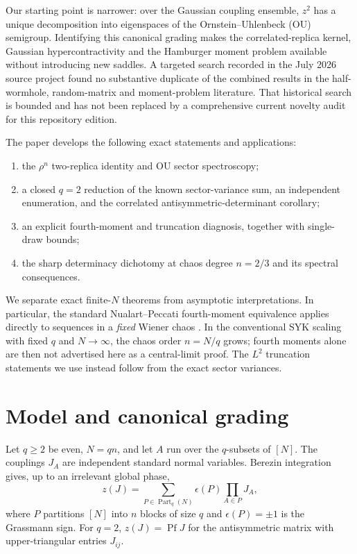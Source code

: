 \documentclass[11pt,a4paper]{article}
\theoremstyle{definition}
\theoremstyle{remark}
\begin{document}
Our starting point is narrower: over the Gaussian coupling ensemble, $z^2$ has a unique
decomposition into eigenspaces of the Ornstein--Uhlenbeck (OU) semigroup.  Identifying this
canonical grading makes the correlated-replica kernel, Gaussian hypercontractivity and the
Hamburger moment problem available without introducing new saddles. A targeted search
recorded in the July 2026 source project found no substantive duplicate of the combined
results in the half-wormhole, random-matrix and moment-problem literature. That historical
search is bounded and has not been replaced by a comprehensive current novelty audit for
this repository edition.

The paper develops the following exact statements and applications:
\begin{enumerate}
\item the $\rho^n$ two-replica identity and OU sector spectroscopy;
\item a closed $q=2$ reduction of the known sector-variance sum, an independent enumeration,
and the correlated antisymmetric-determinant corollary;
\item an explicit fourth-moment and truncation diagnosis, together with single-draw bounds;
\item the sharp determinacy dichotomy at chaos degree $n=2/3$ and its spectral consequences.
\end{enumerate}
We separate exact finite-$N$ theorems from asymptotic interpretations.  In particular, the
standard Nualart--Peccati fourth-moment equivalence applies directly to sequences in a
\emph{fixed} Wiener chaos \citep{NualartPeccati2005,NourdinPeccati2012}.  In the conventional
SYK scaling with fixed $q$ and $N\to\infty$, the chaos order $n=N/q$ grows; fourth moments
alone are then not advertised here as a central-limit proof.  The $L^2$ truncation statements
we use instead follow from the exact sector variances.

\section{Model and canonical grading}

Let $q\ge2$ be even, $N=qn$, and let $A$ run over the $q$-subsets of $[N]$.  The couplings
$J_A$ are independent standard normal variables.  Berezin integration gives, up to an
irrelevant global phase,
\begin{equation}
 z(J)=\sum_{P\in\operatorname{Part}_q(N)}\epsilon(P)\prod_{A\in P}J_A,
 \label{eq:z}
\end{equation}
where $P$ partitions $[N]$ into $n$ blocks of size $q$ and $\epsilon(P)=\pm1$ is the
Grassmann sign.  For $q=2$, $z(J)=\operatorname{Pf}J$ for the antisymmetric matrix with
upper-triangular entries $J_{ij}$.
\end{document}
